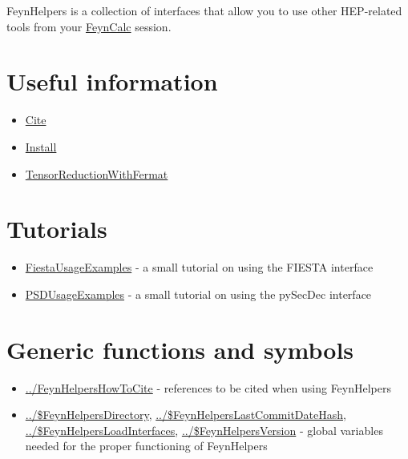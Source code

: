 \documentclass[../FeynHelpersManual.tex]{subfiles}
\begin{document}
FeynHelpers is a collection of interfaces that allow you to use other
HEP-related tools from your \href{https://feyncalc.github.io}{FeynCalc}
session.

\hypertarget{useful information}{
\section{Useful information}\label{useful information}}

\begin{itemize}
\tightlist
\item
  \hyperlink{cite}{Cite}
\item
  \hyperlink{install}{Install}
\item
  \hyperlink{tensorreductionwithfermat}{TensorReductionWithFermat}
\end{itemize}

\hypertarget{tutorials}{
\section{Tutorials}\label{tutorials}}

\begin{itemize}
\tightlist
\item
  \hyperlink{fiestausageexamples}{FiestaUsageExamples} - a small
  tutorial on using the FIESTA interface
\item
  \hyperlink{psdusageexamples}{PSDUsageExamples} - a small tutorial on
  using the pySecDec interface
\end{itemize}

\hypertarget{generic functions and symbols}{
\section{Generic functions and symbols}\label{generic functions and symbols}}

\begin{itemize}
\tightlist
\item
  \hyperlink{../feynhelpershowtocite}{../FeynHelpersHowToCite} -
  references to be cited when using FeynHelpers
\item
  \hyperlink{../dollarfeynhelpersdirectory}{../\$FeynHelpersDirectory},
  \hyperlink{../dollarfeynhelperslastcommitdatehash}{../\$FeynHelpersLastCommitDateHash},
  \hyperlink{../dollarfeynhelpersloadinterfaces}{../\$FeynHelpersLoadInterfaces},
  \hyperlink{../dollarfeynhelpersversion}{../\$FeynHelpersVersion} -
  global variables needed for the proper functioning of FeynHelpers
\end{itemize}
\end{document}
